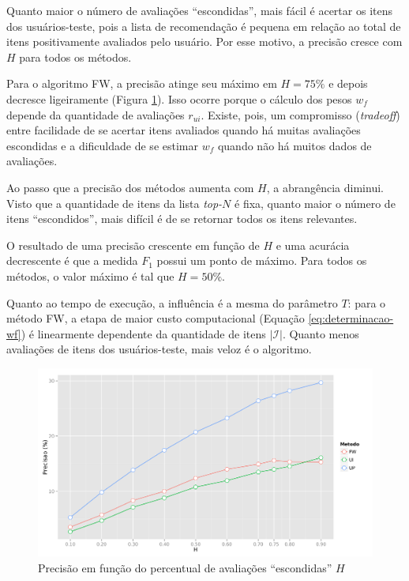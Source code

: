 Quanto maior o número de avaliações ``escondidas'', mais fácil é acertar os itens dos usuários-teste, pois a lista de recomendação é pequena em relação ao total de itens positivamente avaliados pelo usuário. Por esse motivo, a precisão cresce com $H$ para todos os métodos. 

Para o algoritmo FW, a precisão atinge seu máximo em $H=75\%$ e depois decresce ligeiramente (Figura \ref{fig:precision_H}). Isso ocorre porque o cálculo dos pesos $w_f$ depende da quantidade de avaliações $r_{ui}$. Existe, pois, um compromisso (\textit{tradeoff}) entre facilidade de se acertar itens avaliados quando há muitas avaliações escondidas e a dificuldade de se estimar $w_f$ quando não há muitos dados de avaliações.  

Ao passo que a precisão dos métodos aumenta com $H$, a abrangência diminui. Visto que a quantidade de itens da lista \textit{top-}$N$ é fixa, quanto maior o número de itens ``escondidos'', mais difícil é de se retornar todos os itens relevantes.

O resultado de uma precisão crescente em função de $H$ e uma acurácia decrescente é que a medida $F_1$ possui um ponto de máximo. Para todos os métodos, o valor máximo é tal que $H=50\%$.

Quanto ao tempo de execução, a influência é a mesma do parâmetro $T$: 
para o método FW, a etapa de maior custo computacional (Equação \ref{eq:determinacao-wf}) é linearmente dependente da quantidade de itens $\left|\mathcal{I}\right|$. Quanto menos avaliações de itens dos usuários-teste, mais veloz é o algoritmo.


\begin{figure}[htp]
    \begin{center}
    \includegraphics[width=1\textwidth]{img/precision_H}
    \end{center}
    \caption{Precisão em função do percentual de avaliações ``escondidas'' $H$}
    \label{fig:precision_H}
\end{figure}


